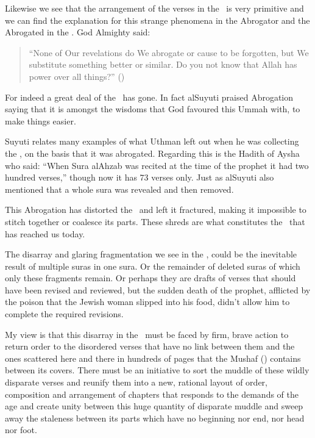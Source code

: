 \documentclass[12pt]{memoir}
\begin{document}

Likewise we see that the arrangement of the verses in the \Quran\
is very primitive and we can find the explanation for this strange phenomena
in the Abrogator and the Abrogated in the \Quran.
God Almighty said:

\begin{quote}
“None of Our revelations do We abrogate or cause to be forgotten,
but We substitute something better or similar.
Do you not know that Allah has power over all things?” ()
\end{quote}

For indeed a great deal of the \Quran\ has gone.\fnmark\@
In fact al\–Suyuti praised Abrogation saying that it is amongst the wisdoms
that God favoured this Ummah with, to make things easier.


Suyuti relates many examples of what Uthman left out
when he was collecting the \Quran, on the basis that it was abrogated.
Regarding this is the Hadith of Aysha who said:
“When Sura al\–Ahzab was recited at the time of the prophet
it had two hundred verses,”\fnmark%
though now it has 73 verses only.
Just as al\–Suyuti also mentioned that a whole sura
was revealed and then removed.\fnmark
{}

This Abrogation has distorted the \Quran\ and left it fractured,
making it impossible to stitch together or coalesce its parts.
These shreds are what constitutes the \Quran\ that has reached us today.

The disarray and glaring fragmentation we see in the \Quran,
could be the inevitable result of multiple suras in one sura.
Or the remainder of deleted suras of which only these fragments remain.
Or perhaps they are drafts of verses
that should have been revised and reviewed,
but the sudden death of the prophet,
afflicted by the poison that the Jewish woman slipped into his food,
didn’t allow him to complete the required revisions.

My view is that this disarray in the \Quran\ must be faced by firm,
brave action to return order to the disordered verses that have no link
between them and the ones scattered here and there in hundreds of pages
that the Mushaf (\NB{name for the \Quran}) contains between its covers.
There must be an initiative to sort the muddle of these wildly disparate verses
and re\–unify them into a new, rational layout of order, composition
and arrangement of chapters that responds to the demands of the age
and create unity between this huge quantity of disparate muddle
and sweep away the staleness between its parts
which have no beginning nor end, nor head nor foot.
\end{document}
